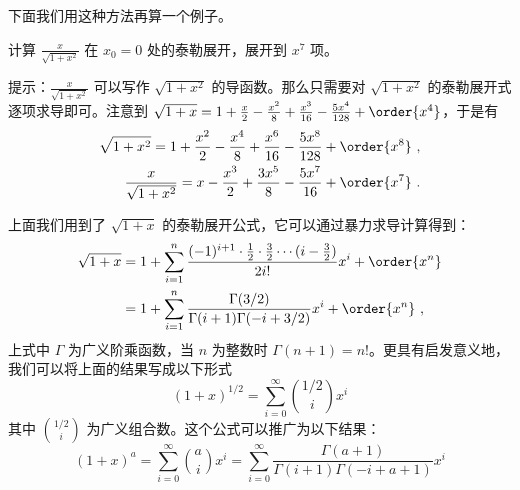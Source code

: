 下面我们用这种方法再算一个例子。
\begin{exercise}{}
计算 $\frac{x}{\sqrt{1+x^2}}$ 在 $x_0=0$ 处的泰勒展开，展开到 $x^7$ 项。
\end{exercise}
提示：$\frac{x}{\sqrt{1+x^2}}$ 可以写作 $\sqrt{1+x^2}$ 的导函数。那么只需要对 $\sqrt{1+x^2}$ 的泰勒展开式逐项求导即可。注意到 $\sqrt{1+x}=1+\frac{x}{2}-\frac{x^2}{8}+\frac{x^3}{16}-\frac{5x^4}{128}+\order{x^4}$，于是有
\begin{equation}
\begin{aligned}
\sqrt{1+x^2}=1+\frac{x^2}{2}-\frac{x^4}{8}+\frac{x^6}{16}-\frac{5x^8}{128}+\order{x^8}~,\\
\frac{x}{\sqrt{1+x^2}}=x-\frac{x^3}{2}+\frac{3x^5}{8}-\frac{5x^7}{16}+\order{x^7}~.
\end{aligned}
\end{equation}

上面我们用到了 $\sqrt{1+x}$ 的泰勒展开公式，它可以通过暴力求导计算得到：
\begin{equation}
\begin{aligned}
\sqrt{1+x}&=1+\sum_{i=1}^n\frac{(-1)^{i+1} \cdot \frac{1}{2}\cdot \frac{3}{2}\cdots (i-\frac{3}{2})}{2i!}x^i +\order{x^n}\\
&=1+\sum_{i=1}^n\frac{\Gamma(3/2)}{\Gamma(i+1)\Gamma(-i+3/2)}x^i +\order{x^n}~,
\end{aligned}
\end{equation}
上式中 $\Gamma$ 为广义阶乘函数，当 $n$ 为整数时 $\Gamma(n+1)=n!$。更具有启发意义地，我们可以将上面的结果写成以下形式
\begin{equation}
(1+x)^{1/2}=\sum_{i=0}^{\infty}{1/2\choose i}x^i
\end{equation}
其中 ${1/2\choose i}$ 为广义组合数。这个公式可以推广为以下结果：
\begin{equation}
(1+x)^{a}=\sum_{i=0}^{\infty}{a\choose i}x^i=\sum_{i=0}^{\infty}\frac{\Gamma(a+1)}{\Gamma(i+1)\Gamma(-i+a+1)}x^i
\end{equation}


